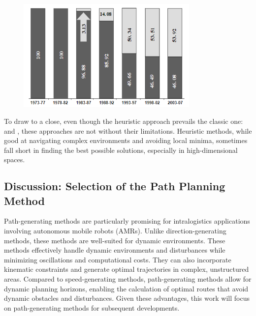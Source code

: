 \begin{figure}[H]
    \centering  
    \includegraphics[width=3.5in]{images/Chap1/heuristic_barchart.png}\\ 
    \label{heuristic barchart} 
\end{figure}

To draw to a close, even though the heuristic approach prevails the classic one:
\cite{R20} and \cite{R25}, these approaches are not without their limitations. Heuristic methods, while good at 
navigating complex environments and avoiding local minima, sometimes fall short in finding the best possible 
solutions, especially in high-dimensional spaces.

\subsection{Discussion: Selection of the Path Planning Method}

Path-generating methods are particularly promising for intralogistics applications involving autonomous 
mobile robots (AMRs). Unlike direction-generating methods, these methods are well-suited for dynamic environments. 
These methods effectively handle dynamic environments and disturbances while minimizing oscillations and 
computational costs.
They can also incorporate kinematic constraints and generate optimal trajectories in complex, unstructured areas. 
Compared to speed-generating methods, path-generating methods allow for dynamic planning horizons, enabling the 
calculation of optimal routes that avoid dynamic obstacles and disturbances. Given these advantages, this work 
will focus on path-generating methods for subsequent developments.



